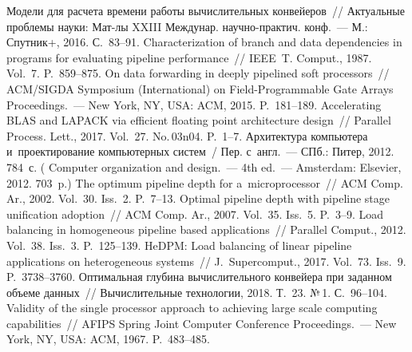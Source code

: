 \begin{multicols}{2}
\vspace*{-6pt} 
    
{\small\frenchspacing
 {%
 \begin{thebibliography}{99}
 Модели для 
расчета времени работы вычислительных конвейеров~// Актуальные проблемы 
науки: Мат-лы XXIII Междунар. научно-практич. конф.~--- М.: Спутник+, 2016. 
С.~83--91. 
 Characterization of branch and data dependencies in 
programs for evaluating pipeline performance~// IEEE~T. Comput., 1987. Vol.~7. 
P.~859--875.
 On data forwarding in deeply pipelined soft 
processors~// ACM/SIGDA Symposium (International) on Field-Programmable Gate 
Arrays Proceedings.~--- New York, NY, USA: ACM, 2015. P.~181--189.
Accelerating 
BLAS and LAPACK via efficient floating point architecture design~// Parallel Process. 
Lett., 2017. Vol.~27. No.\,03n04. P.~1--7.
 Архитектура компьютера и~проектирование 
компьютерных систем~/ Пер. с~англ.~--- СПб.: Питер, 2012. 784~с. 
( Computer organization and design.~---
4th ed.~--- 
Amsterdam: Elsevier, 2012. 703~p.)
 The optimum pipeline depth for a~microprocessor~// ACM 
 Comp. Ar., 2002. Vol.~30. Iss.~2. P.~7--13. 
 Optimal pipeline depth with pipeline stage unification 
adoption~// ACM Comp. Ar., 2007. Vol.~35. Iss.~5. P.~3--9.
 Load 
balancing in homogeneous pipeline based applications~// Parallel Comput., 2012. Vol.~38. 
Iss.~3. P.~125--139.
HeDPM: Load balancing of linear pipeline applications on heterogeneous systems~// 
J.~Supercomput., 2017. Vol.~73. Iss.~9. P.~3738--3760.
 Оптимальная глубина вычислительного 
конвейера при заданном объеме данных~// Вычислительные технологии, 2018. Т.~23. 
№\,1. С.~96--104.
 Validity of the single processor approach to achieving large scale 
computing capabilities~// AFIPS Spring Joint Computer Conference Proceedings.~--- New 
York, NY, USA: ACM, 1967. P.~483--485.

\end{thebibliography}}}
\end{multicols}
